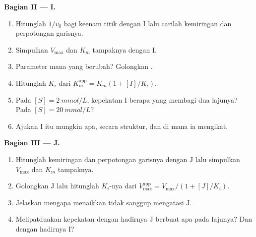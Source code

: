 \begin{problem}
\medskip
\noindent\textbf{Bagian II ---  I.}
\begin{enumerate}[resume]
  \item Hitunglah $1/v_0$ bagi keenam titik dengan I lalu carilah
        kemiringan dan perpotongan garisnya.
  \item Simpulkan $V_{\max}$ dan $K_m$ tampaknya dengan I.
  \item Parameter mana yang berubah? Golongkan .
  \item Hitunglah $K_i$ dari $K_m^{\text{app}} = K_m(1 + [I]/K_i)$.
  \item Pada $[S] = \qty{2}{mmol/L}$, kepekatan I berapa yang membagi
        dua lajunya? Pada $[S] = \qty{20}{mmol/L}$?
  \item Ajukan I itu mungkin apa, secara struktur, dan di mana ia
        mengikat.
\end{enumerate}

\medskip
\noindent\textbf{Bagian III ---  J.}
\begin{enumerate}[resume]
  \item Hitunglah kemiringan dan perpotongan garisnya dengan J lalu
        simpulkan $V_{\max}$ dan $K_m$ tampaknya.
  \item Golongkan J lalu hitunglah $K_i$-nya dari $V_{\max}^{\text{app}} =
        V_{\max}/(1 + [J]/K_i)$.
  \item Jelaskan mengapa menaikkan  tidak sanggup mengatasi J.
  \item Melipatduakan kepekatan  dengan hadirnya J berbuat apa
        pada lajunya? Dan dengan hadirnya I?
\end{enumerate}


\end{problem}
